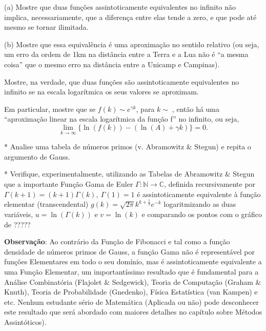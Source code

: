 \begin{exercise}
(a) Mostre que duas funções assintoticamente equivalentes no infinito não implica, necessariamente, que a diferença entre elas tende a zero, e que pode até mesmo se tornar ilimitada.

(b) Mostre que essa equivalência é uma aproximação no sentido relativo (ou seja, um erro da ordem de 1km na distância entre a Terra e a Lua não é ``a mesma coisa'' que o mesmo erro na distância entre a Unicamp e Campinas).
\end{exercise}

\begin{exercise}
Mostre, na verdade, que duas funções são assintoticamente equivalentes no infinito se na escala logarítmica os seus valores se aproximam.
\end{exercise}

\begin{exercise}
Em particular, mostre que se \(f(k) \sim e^{\gamma k}\), para \(k \sim \), então há uma ``aproximação linear na escala logarítmica da função f'' no infinito, ou seja,
\[\displaystyle\lim_{k \to \infty} \{\ln(f(k)) - (\ln(A)+\gamma k)\} = 0.\]
\end{exercise}

\begin{exercise}*
Analise uma tabela de números primos (v. Abramowitz \& Stegun) e repita o argumento de Gauss.
\end{exercise}

\begin{exercise}*
Verifique, experimentalmente, utilizando as Tabelas de Abramowitz \& Stegun que a importante Função Gama de Euler \(\Gamma: \mathbb{N} \to \mathbb{C}\), definida recursivamente por \(\Gamma(k+1) = (k+1) \Gamma(k),\ \Gamma(1) = 1\) é assintoticamente equivalente à função elementar (transcendental) \(g(k) = \sqrt{2\pi} k^{k+\frac{1}{2}} e^{-k}\) logaritmizando as duas variáveis, \(u = \ln(\Gamma(k))\) e \(v = \ln(k)\) e comparando os pontos com o gráfico de {\color{red} ?????}

\textbf{Observação}: Ao contrário da Função de Fibonacci e tal como a função densidade de números primos de Gauss, a função Gama não é representável por funções Elementares em todo o seu domínio, mas é assintoticamente equivalente a uma Função Elementar, um importantíssimo resultado que é fundamental para a Análise Combinatória (Flajolet \& Sedgewick), Teoria de Computação (Graham \& Knuth), Teoria de Probabilidade (Gnedenko), Física Estatística (van Kampen) e etc. Nenhum estudante sério de Matemática (Aplicada ou não) pode desconhecer este resultado que será abordado com maiores detalhes no capítulo sobre Métodos Assintóticos).
\end{exercise}

